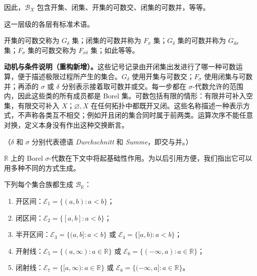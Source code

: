 \documentclass[../../main.tex]{subfiles}%
\begin{document}
因此，$\mathscr{B}_X$ 包含开集、闭集、开集的可数交、闭集的可数并，等等。

这一层级的各层有标准术语。
\begin{definition}\label{definition:ch01-borel-hierarchy}
开集的可数交称为 $G_\delta$ 集；闭集的可数并称为 $F_\sigma$ 集；$G_\delta$ 集的可数并称为 $G_{\delta\sigma}$ 集；$F_\sigma$ 集的可数交称为 $F_{\sigma\delta}$ 集；如此等等。
\end{definition}
\begin{remark}
\textbf{动机与条件说明（重构新增）。}这些记号记录由开闭集出发进行了哪一种可数运算，便于描述极限过程所产生的集合。$G_\delta$ 使用开集与可数交；$F_\sigma$ 使用闭集与可数并；再添的 $\sigma$ 或 $\delta$ 分别表示接着取可数并或交。每一步都在 $\sigma$-代数允许的范围内，因此这些类的所有成员都是 Borel 集。可数包括有限的情形：有限并可补入空集，有限交可补入 $X$；$\varnothing,X$ 在任何拓扑中都既开又闭。这些名称描述一种表示方式，不声称各类互不相交；例如开且闭的集合同时属于前两类。运算次序不能任意对换，定义本身没有作出这种交换断言。
\end{remark}

（$\delta$ 和 $\sigma$ 分别代表德语 \emph{Durchschnitt} 和 \emph{Summe}，即交与并。）

$\mathbb{R}$ 上的 Borel $\sigma$-代数在下文中将起基础性作用。为以后引用方便，我们指出它可以用多种不同的方式生成。

\begin{proposition}\label{proposition:ch01-real-borel-generators}
下列每个集合族都生成 $\mathscr{B}_{\mathbb{R}}$：
\begin{enumerate}[label=\alph*.,ref=(\alph*)]
\item\label{item:ch01-borel-open-intervals} 开区间：$\mathscr{E}_1=\{(a,b):a<b\}$；
\item\label{item:ch01-borel-closed-intervals} 闭区间：$\mathscr{E}_2=\{[a,b]:a<b\}$；
\item\label{item:ch01-borel-half-open-intervals} 半开区间：$\mathscr{E}_3=\{(a,b]:a<b\}$ 或 $\mathscr{E}_4=\{[a,b):a<b\}$；
\item\label{item:ch01-borel-open-rays} 开射线：$\mathscr{E}_5=\{(a,\infty):a\in\mathbb{R}\}$ 或 $\mathscr{E}_6=\{(-\infty,a):a\in\mathbb{R}\}$；
\item\label{item:ch01-borel-closed-rays} 闭射线：$\mathscr{E}_7=\{[a,\infty):a\in\mathbb{R}\}$ 或 $\mathscr{E}_8=\{(-\infty,a]:a\in\mathbb{R}\}$。
\end{enumerate}
\end{proposition}
\end{document}

